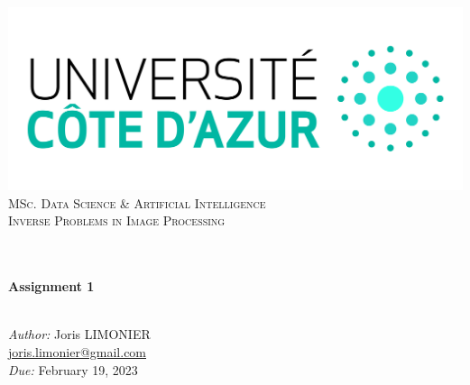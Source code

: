 \begin{titlepage}
	\begin{center}
		\includegraphics[width=\textwidth]{images/logo_uca.jpeg}\\[0.1cm]
		\vspace{1.5cm}
		\textsc{\Large MSc. Data Science \& Artificial Intelligence}\\[1.2cm]
		\textsc{\Large Inverse Problems in Image Processing}\\[1.2cm]
		\\
		\vspace{1cm}

		\HRule \\[0.6cm]
		{\huge \bfseries Assignment 1}\\[0.3cm]
		\HRule \\[1.8cm]
		\vfill

		\large
		\emph{Author:} Joris LIMONIER\\[.2cm]
		\href{mailto:joris.limonier@gmail.com}{\color{black}joris.limonier@gmail.com} \\[.2cm]
		\emph{Due:} {\large February 19, 2023}
	\end{center}
\end{titlepage}


